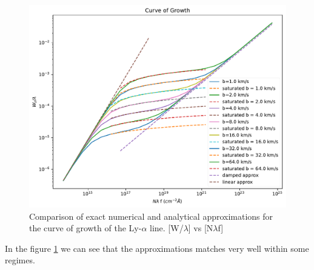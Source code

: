 \documentclass[12pt]{article}
\begin{document}
\begin{figure}[H]
	\centering
	\includegraphics[width=1\linewidth]{../CoG_Ly-alpha-approx_gen}
	\caption{Comparison of exact numerical and analytical approximations for the curve of growth of the Ly-$\alpha$ line. [W/$\lambda$] vs [N$\lambda$f]}
	\label{fig:cogly-alpha-approxgen}
\end{figure}
In the figure \ref{fig:cogly-alpha-approxgen} we can see that the approximations matches very well within some regimes.

\newpage
\end{document}
